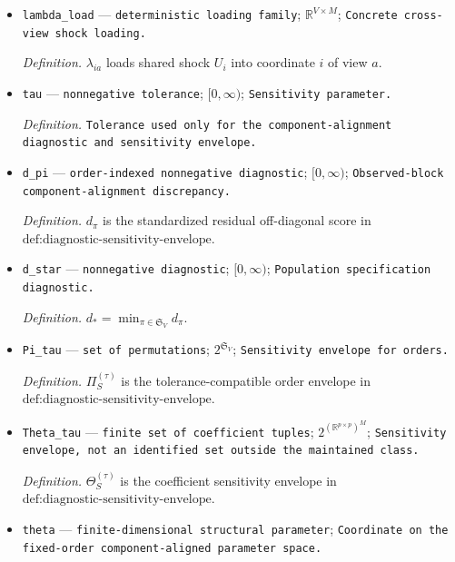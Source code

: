\documentclass{article}
\begin{document}
\begin{itemize}
  \par\smallskip\noindent\emph{Definition.} \(\eta_i^{(a)}\) is coordinate- and view-specific readout noise in \(\text{def:coordinate-sensor-mechanism}\).
  \item \texttt{lambda\_\allowbreak{}load} --- \texttt{deterministic loading family}; \(\mathbb R^{V\times M}\); \texttt{Concrete cross-\allowbreak{}view shock loading.}
  \par\smallskip\noindent\emph{Definition.} \(\lambda_{ia}\) loads shared shock \(U_i\) into coordinate \(i\) of view \(a\).
  \item \texttt{tau} --- \texttt{nonnegative tolerance}; \([0,\infty)\); \texttt{Sensitivity parameter.}
  \par\smallskip\noindent\emph{Definition.} \texttt{Tolerance used only for the component-\allowbreak{}alignment diagnostic and sensitivity envelope.}
  \item \texttt{d\_\allowbreak{}pi} --- \texttt{order-\allowbreak{}indexed nonnegative diagnostic}; \([0,\infty)\); \texttt{Observed-\allowbreak{}block component-\allowbreak{}alignment discrepancy.}
  \par\smallskip\noindent\emph{Definition.} \(d_\pi\) is the standardized residual off-diagonal score in \(\text{def:diagnostic-sensitivity-envelope}\).
  \item \texttt{d\_\allowbreak{}star} --- \texttt{nonnegative diagnostic}; \([0,\infty)\); \texttt{Population specification diagnostic.}
  \par\smallskip\noindent\emph{Definition.} \(d_*=\min_{\pi\in\mathfrak S_V}d_\pi\).
  \item \texttt{Pi\_\allowbreak{}tau} --- \texttt{set of permutations}; \(2^{\mathfrak S_V}\); \texttt{Sensitivity envelope for orders.}
  \par\smallskip\noindent\emph{Definition.} \(\Pi_S^{(\tau)}\) is the tolerance-compatible order envelope in \(\text{def:diagnostic-sensitivity-envelope}\).
  \item \texttt{Theta\_\allowbreak{}tau} --- \texttt{finite set of coefficient tuples}; \(2^{(\mathbb R^{p\times p})^M}\); \texttt{Sensitivity envelope,\allowbreak{} not an identified set outside the maintained class.}
  \par\smallskip\noindent\emph{Definition.} \(\Theta_S^{(\tau)}\) is the coefficient sensitivity envelope in \(\text{def:diagnostic-sensitivity-envelope}\).
  \item \texttt{theta} --- \texttt{finite-\allowbreak{}dimensional structural parameter}; \texttt{Coordinate on the fixed-\allowbreak{}order component-\allowbreak{}aligned parameter space.}

\end{itemize}
\end{document}
